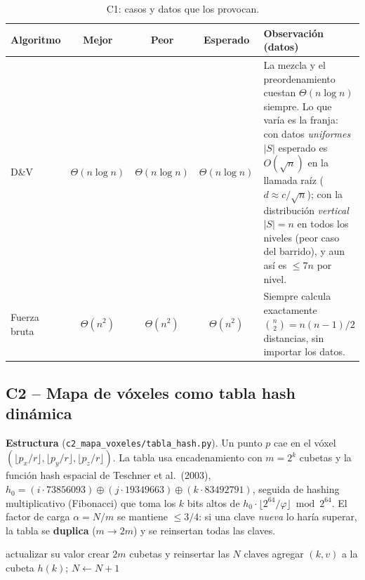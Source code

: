 \documentclass[11pt,letterpaper]{article}
\theoremstyle{plain}
\theoremstyle{definition}
\newcommand{\Th}{\Theta}
\begin{document}
\begin{table}[H]
\centering\small
\caption{C1: casos y datos que los provocan.}
\begin{tabularx}{\linewidth}{l c c c X}
\toprule
Algoritmo & Mejor & Peor & Esperado & Observación (datos) \\
\midrule
D\&V & $\Th(n\log n)$ & $\Th(n\log n)$ & $\Th(n\log n)$ & La mezcla y el preordenamiento cuestan $\Th(n\log n)$ siempre. Lo que varía es la franja: con datos \emph{uniformes} $|S|$ esperado es $O(\sqrt n)$ en la llamada raíz ($d\approx c/\sqrt n$); con la distribución \emph{vertical} $|S|=n$ en todos los niveles (peor caso del barrido), y aun así es $\le 7n$ por nivel. \\
Fuerza bruta & $\Th(n^2)$ & $\Th(n^2)$ & $\Th(n^2)$ & Siempre calcula exactamente $\binom n2=n(n-1)/2$ distancias, sin importar los datos. \\
\bottomrule
\end{tabularx}
\end{table}

\subsection{C2 -- Mapa de vóxeles como tabla hash dinámica}

\textbf{Estructura} (\texttt{c2\_mapa\_voxeles/tabla\_hash.py}). Un punto $p$ cae en el vóxel
$(\lfloor p_x/r\rfloor,\lfloor p_y/r\rfloor,\lfloor p_z/r\rfloor)$. La tabla usa encadenamiento con
$m=2^k$ cubetas y la función hash espacial de Teschner et al.\ (2003),
$h_0=(i\cdot 73856093)\oplus(j\cdot 19349663)\oplus(k\cdot 83492791)$, seguida de hashing multiplicativo
(Fibonacci) que toma los $k$ bits altos de $h_0\cdot\lfloor 2^{64}/\varphi\rfloor \bmod 2^{64}$.
El factor de carga $\alpha=N/m$ se mantiene $\le 3/4$: si una clave \emph{nueva} lo haría superar,
la tabla se \textbf{duplica} ($m\to2m$) y se reinsertan todas las claves.

\begin{algorithm}[H]
\caption{\textsc{Insertar}$(k, v)$ con duplicación}
\begin{algorithmic}[1]
 actualizar su valor 
\Else
   crear $2m$ cubetas y reinsertar las $N$ claves 
  \EndIf
  \State agregar $(k,v)$ a la cubeta $h(k)$; $N\gets N+1$ 
\EndIf
\end{algorithmic}
\end{algorithm}
\end{document}
